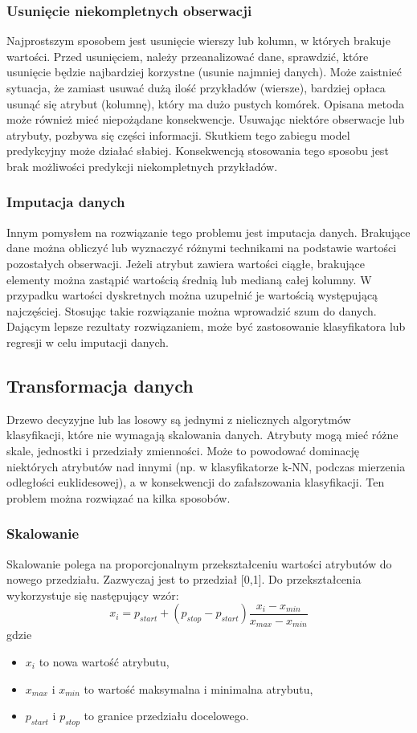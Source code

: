 \subsubsection{Usunięcie niekompletnych obserwacji}
Najprostszym sposobem jest usunięcie wierszy lub kolumn, w których brakuje wartości. Przed usunięciem, należy przeanalizować dane, sprawdzić, które usunięcie będzie najbardziej korzystne (usunie najmniej danych). Może zaistnieć sytuacja, że zamiast usuwać dużą ilość przykładów (wiersze), bardziej opłaca usunąć się atrybut (kolumnę), który ma dużo pustych komórek. Opisana metoda może również mieć niepożądane konsekwencje. Usuwając niektóre obserwacje lub atrybuty, pozbywa się części informacji. Skutkiem tego zabiegu model predykcyjny może działać słabiej. Konsekwencją stosowania tego sposobu jest brak możliwości predykcji niekompletnych przykładów.
\subsubsection{Imputacja danych}
Innym pomysłem na rozwiązanie tego problemu jest imputacja danych. Brakujące dane można obliczyć lub wyznaczyć różnymi technikami na podstawie wartości pozostałych obserwacji. Jeżeli atrybut zawiera wartości ciągłe, brakujące elementy można zastąpić wartością średnią lub medianą całej kolumny. W przypadku wartości dyskretnych można uzupełnić je wartością występującą najczęściej. Stosując takie rozwiązanie można wprowadzić szum do danych. Dającym lepsze rezultaty rozwiązaniem, może być zastosowanie klasyfikatora lub regresji w celu imputacji danych.
\subsection{Transformacja danych}
Drzewo decyzyjne lub las losowy są jednymi z nielicznych algorytmów klasyfikacji, które nie wymagają skalowania danych. Atrybuty mogą mieć różne skale, jednostki i przedziały zmienności. Może to powodować dominację niektórych atrybutów nad innymi (np. w klasyfikatorze k-NN, podczas mierzenia odległości euklidesowej), a w konsekwencji do zafałszowania klasyfikacji. Ten problem można rozwiązać na kilka sposobów.
\subsubsection{Skalowanie}
Skalowanie polega na proporcjonalnym przekształceniu wartości atrybutów do nowego przedziału. Zazwyczaj jest to przedział [0,1]. Do przekształcenia wykorzystuje się następujący wzór:
\[x_i=p_{start}+(p_{stop}-p_{start})\frac{x_i-x_{min}}{x_{max}-x_{min}}\]
gdzie 
\begin{itemize}
	\item $x_i$ to nowa wartość atrybutu,
	\item $x_{max}$ i $x_{min}$ to wartość maksymalna i minimalna atrybutu,
	\item $p_{start}$ i $p_{stop}$ to granice przedziału docelowego.
\end{itemize}
